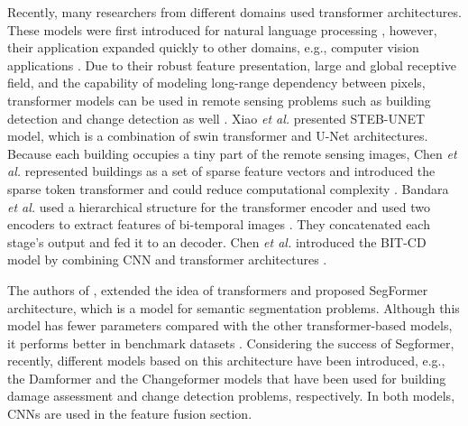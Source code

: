 \documentclass{article}
\begin{document}
Recently, many researchers from different domains used transformer architectures. These models were first introduced for natural language processing \cite{vaswani2017attention}, however, their application expanded quickly to other domains, e.g., computer vision applications \cite{dosovitskiy2020image, xie2021segformer}. Due to their robust feature presentation, large and global receptive field, and the capability of modeling long-range dependency between pixels, transformer models can be used in remote sensing problems such as building detection and change detection as well \cite{chen2021building}. Xiao \textit{et al.} \cite{xiao2022swin} presented STEB-UNET model, which is a combination of swin transformer and U-Net architectures. Because each building occupies a tiny part of the remote sensing images, Chen \textit{et al.} represented buildings as a set of sparse feature vectors and introduced the sparse token transformer and could reduce computational complexity \cite{chen2021building}. Bandara \textit{et al.} used a hierarchical structure for the transformer encoder and used two encoders to extract features of bi-temporal images \cite{bandara2022transformer}. They concatenated each stage’s output and fed it to an decoder. Chen \textit{et al.} introduced the BIT-CD model by combining CNN and transformer architectures \cite{chen2021remote}.

The authors of \cite{xie2021segformer}, extended the idea of transformers and proposed SegFormer architecture, which is a model for semantic segmentation problems. Although this model has fewer parameters compared with the other transformer-based models, it performs better in benchmark datasets \cite{xie2021segformer}. Considering the success of Segformer, recently, different models based on this architecture have been introduced, e.g., the Damformer \cite{chen2022dual} and the Changeformer \cite{bandara2022transformer} models that have been used for building damage assessment and change detection problems, respectively. In both models, CNNs are used in the feature fusion section.
\end{document}
